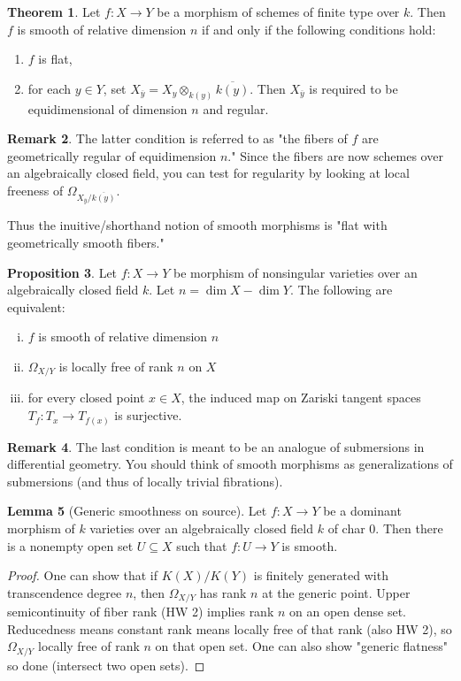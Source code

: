 \documentclass[10pt,reqno]{amsart}
\theoremstyle{definition}
\newtheorem{theorem}{Theorem}
\newtheorem{proposition}[theorem]{Proposition}
\newtheorem{lemma}[theorem]{Lemma}
\newtheorem{remark}[theorem]{Remark}
\theoremstyle{remark}
\numberwithin{equation}{section}
\numberwithin{theorem}{section}
\begin{document}
\begin{theorem} Let $f:X \to Y$ be a morphism of schemes of finite type over $k$. Then $f$ is smooth of relative dimension $n$ if and only if the following conditions hold:
\begin{enumerate}
\item $f$ is flat,
\item for each $y \in Y$, set $X_{\overline{y}} = X_y \otimes_{k(y)} \overline{k(y)}$. Then $X_{\overline{y}}$ is required to be equidimensional of dimension $n$ and regular.
\end{enumerate}
\end{theorem}

\begin{remark} The latter condition is referred to as "the fibers of $f$ are geometrically regular of equidimension $n$." Since the fibers are now schemes over an algebraically closed field, you can test for regularity by looking at local freeness of $\Omega_{X_{\overline{y}}/\overline{k(y)}}$.

Thus the inuitive/shorthand notion of smooth morphisms is "flat with geometrically smooth fibers."
\end{remark}

\begin{proposition}\label{prop:smooth-morphisms-surjective-tan-spaces} Let $f: X \to Y$ be morphism of nonsingular varieties over an algebraically closed field $k$. Let $n = \dim X - \dim Y$. The following are equivalent:
\begin{enumerate}[(i)]
\item $f$ is smooth of relative dimension $n$
\item $\Omega_{X/Y}$ is locally free of rank $n$ on $X$
\item for every closed point $x \in X$, the induced map on Zariski tangent spaces $T_f: T_x \to T_{f(x)}$ is surjective.
\end{enumerate} 
\end{proposition}

\begin{remark} The last condition is meant to be an analogue of submersions in differential geometry. You should think of smooth morphisms as generalizations of submersions (and thus of locally trivial fibrations).
\end{remark}

\begin{lemma}[Generic smoothness on source] Let $f:X \to Y$ be a dominant morphism of $k$ varieties over an algebraically closed field $k$ of char $0$. Then there is a nonempty open set $U \subseteq X$ such that $f: U \to Y$ is smooth.
\end{lemma}
\begin{proof} One can show that if $K(X)/K(Y)$ is finitely generated with transcendence degree $n$, then $\Omega_{X/Y}$ has rank $n$ at the generic point. Upper semicontinuity of fiber rank (HW 2) implies rank $n$ on an open dense set. Reducedness means constant rank means locally free of that rank (also HW 2), so $\Omega_{X/Y}$ locally free of rank $n$ on that open set. One can also show "generic flatness" so done (intersect two open sets).
\end{proof}
\end{document}
